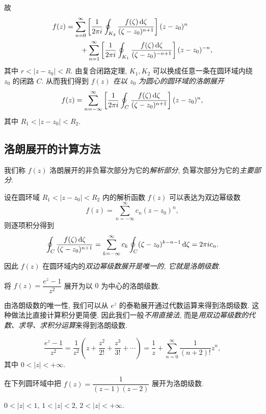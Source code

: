 故
\begin{align*}
f(z)&=\sum_{n=0}^\infty\left[\frac1{2\pi i}\oint_{K_2}\frac{f(\zeta)\,\mathrm{d}\zeta}{(\zeta-z_0)^{n+1}}\right](z-z_0)^n\\
&\qquad+\sum_{n=1}^\infty \left[\frac1{2\pi i}\oint_{K_1}\frac{f(\zeta)\,\mathrm{d}\zeta}{(\zeta-z_0)^{-n+1}}\right](z-z_0)^{-n},
\end{align*}
其中 $r<|z-z_0|<R$.
由复合闭路定理, $K_1,K_2$ 可以换成任意一条在圆环域内绕 $z_0$ 的闭路 $C$.
从而我们得到 \emph{$f(z)$ 在以 $z_0$ 为圆心的圆环域的洛朗展开}
	\[f(z)=\sum_{n=-\infty}^\infty\left[\frac1{2\pi i}\oint_C\frac{f(\zeta)\,\mathrm{d}\zeta}{(\zeta-z_0)^{n+1}}\right](z-z_0)^n,\]
其中 $R_1<|z-z_0|<R_2$.

\subsection{洛朗展开的计算方法}

我们称 $f(z)$ 洛朗展开的非负幂次部分为它的\emph{解析部分}, 负幂次部分为它的\emph{主要部分}.

设在圆环域 $R_1<|z-z_0|<R_2$ 内的解析函数 $f(z)$ 可以表达为双边幂级数
\[f(z)=\sum_{n=-\infty}^\infty c_n(z-z_0)^n,\]
则逐项积分得到
\[\oint_C\frac{f(\zeta)\,\mathrm{d}\zeta}{(\zeta-z_0)^{n+1}}=\sum_{k=-\infty}^\infty c_k\oint_C(\zeta-z_0)^{k-n-1}\,\mathrm{d}\zeta=2\pi i c_n.\]
因此 $f(z)$ 在圆环域内的\emph{双边幂级数展开是唯一的, 它就是洛朗级数}.

\begin{example}
	将 $f(z)=\dfrac{e^z-1}{z^2}$ 展开为以 $0$ 为中心的洛朗级数.
\end{example}

由洛朗级数的唯一性, 我们可以从 $e^z$ 的泰勒展开通过代数运算来得到洛朗级数.
这种做法比直接计算积分更简便.
因此我们一般\emph{不用直接法}, 而是\emph{用双边幂级数的代数、求导、求积分运算}来得到洛朗级数.

\begin{solution}
	\[\frac{e^z-1}{z^2}=\frac1{z^2}\left(z+\frac{z^2}{2!}+\frac{z^3}{3!}+\cdots\right)
	{=\frac1z+\sum_{n=0}^\infty \frac1{(n+2)!}z^n,}\]
	{其中 $0<|z|<+\infty$.}
\end{solution}

\begin{example}
	在下列圆环域中把 $f(z)=\dfrac1{(z-1)(z-2)}$ 展开为洛朗级数.

	{ $0<|z|<1$,  $1<|z|<2$,  $2<|z|<+\infty$.}
\end{example}

